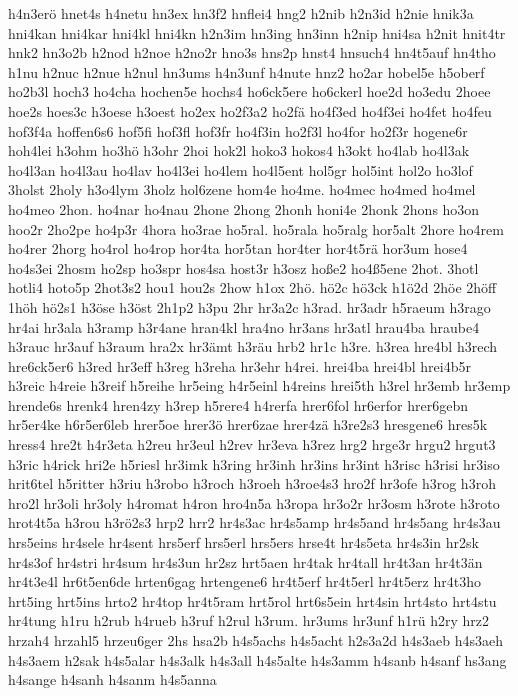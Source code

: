 {h4n3erö
hnet4s
h4netu
hn3ex
hn3f2
hnflei4
hng2
h2nib
h2n3id
h2nie
hnik3a
hni4kan
hni4kar
hni4kl
hni4kn
h2n3im
hn3ing
hn3inn
h2nip
hni4sa
h2nit
hnit4tr
hnk2
hn3o2b
h2nod
h2noe
h2no2r
hno3s
hns2p
hnst4
hnsuch4
hn4t5auf
hn4tho
h1nu
h2nuc
h2nue
h2nul
hn3ums
h4n3unf
h4nute
hnz2
ho2ar
hobel5e
h5oberf
ho2b3l
hoch3
ho4cha
hochen5e
hochs4
ho6ck5ere
ho6ckerl
hoe2d
ho3edu
2hoee
hoe2s
hoes3c
h3oese
h3oest
ho2ex
ho2f3a2
ho2fä
ho4f3ed
ho4f3ei
ho4fet
ho4feu
hof3f4a
hoffen6s6
hof5fi
hof3fl
hof3fr
ho4f3in
ho2f3l
ho4for
ho2f3r
hogene6r
hoh4lei
h3ohm
ho3hö
h3ohr
2hoi
hok2l
hoko3
hokos4
h3okt
ho4lab
ho4l3ak
ho4l3an
ho4l3au
ho4lav
ho4l3ei
ho4lem
ho4l5ent
hol5gr
hol5int
hol2o
ho3lof
3holst
2holy
h3o4lym
3holz
hol6zene
hom4e
ho4me.
ho4mec
ho4med
ho4mel
ho4meo
2hon.
ho4nar
ho4nau
2hone
2hong
2honh
honi4e
2honk
2hons
ho3on
hoo2r
2ho2pe
ho4p3r
4hora
ho3rae
ho5ral.
ho5rala
ho5ralg
hor5alt
2hore
ho4rem
ho4rer
2horg
ho4rol
ho4rop
hor4ta
hor5tan
hor4ter
hor4t5rä
hor3um
hose4
ho4s3ei
2hosm
ho2sp
ho3spr
hos4sa
host3r
h3osz
hoße2
ho4ß5ene
2hot.
3hotl
hotli4
hoto5p
2hot3s2
hou1
hou2s
2how
h1ox
2hö.
hö2c
hö3ck
h1ö2d
2höe
2höff
1höh
hö2s1
h3öse
h3öst
2h1p2
h3pu
2hr
hr3a2c
h3rad.
hr3adr
h5raeum
h3rago
hr4ai
hr3ala
h3ramp
h3r4ane
hran4kl
hra4no
hr3ans
hr3atl
hrau4ba
hraube4
h3rauc
hr3auf
h3raum
hra2x
hr3ämt
h3räu
hrb2
hr1c
h3re.
h3rea
hre4bl
h3rech
hre6ck5er6
h3red
hr3eff
h3reg
h3reha
hr3ehr
h4rei.
hrei4ba
hrei4bl
hrei4b5r
h3reic
h4reie
h3reif
h5reihe
hr5eing
h4r5einl
h4reins
hrei5th
h3rel
hr3emb
hr3emp
hrende6s
hrenk4
hren4zy
h3rep
h5rere4
h4rerfa
hrer6fol
hr6erfor
hrer6gebn
hr5er4ke
h6r5er6leb
hrer5oe
hrer3ö
hrer6zae
hrer4zä
h3re2s3
hresgene6
hres5k
hress4
hre2t
h4r3eta
h2reu
hr3eul
h2rev
hr3eva
h3rez
hrg2
hrge3r
hrgu2
hrgut3
h3ric
h4rick
hri2e
h5riesl
hr3imk
h3ring
hr3inh
hr3ins
hr3int
h3risc
h3risi
hr3iso
hrit6tel
h5ritter
h3riu
h3robo
h3roch
h3roeh
h3roe4s3
hro2f
hr3ofe
h3rog
h3roh
hro2l
hr3oli
hr3oly
h4romat
h4ron
hro4n5a
h3ropa
hr3o2r
hr3osm
h3rote
h3roto
hrot4t5a
h3rou
h3rö2s3
hrp2
hrr2
hr4s3ac
hr4s5amp
hr4s5and
hr4s5ang
hr4s3au
hrs5eins
hr4sele
hr4sent
hrs5erf
hrs5erl
hrs5ers
hrse4t
hr4s5eta
hr4s3in
hr2sk
hr4s3of
hr4stri
hr4sum
hr4s3un
hr2sz
hrt5aen
hr4tak
hr4tall
hr4t3an
hr4t3än
hr4t3e4l
hr6t5en6de
hrten6gag
hrtengene6
hr4t5erf
hr4t5erl
hr4t5erz
hr4t3ho
hrt5ing
hrt5ins
hrto2
hr4top
hr4t5ram
hrt5rol
hrt6s5ein
hrt4sin
hrt4sto
hrt4stu
hr4tung
h1ru
h2rub
h4rueb
h3ruf
h2rul
h3rum.
hr3ums
hr3unf
h1rü
h2ry
hrz2
hrzah4
hrzahl5
hrzeu6ger
2hs
hsa2b
h4s5achs
h4s5acht
h2s3a2d
h4s3aeb
h4s3aeh
h4s3aem
h2sak
h4s5alar
h4s3alk
h4s3all
h4s5alte
h4s3amm
h4sanb
h4sanf
hs3ang
h4sange
h4sanh
h4sanm
h4s5anna
}
